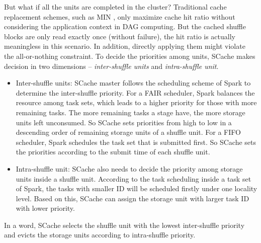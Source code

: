 But what if all the units are completed in the cluster? Traditional cache replacement schemes, such as MIN \cite{min}, only maximize cache hit ratio without considering the application context in DAG computing. But the cached shuffle blocks are only read exactly once (without failure), the hit ratio is actually meaningless in this scenario.
In addition, directly applying them might violate the all-or-nothing constraint.
To decide the priorities among units, SCache makes decision in two dimensions -- \textit{inter-shuffle units} and \textit{intra-shuffle unit}.
\begin{itemize}[noitemsep]
	\item Inter-shuffle units: SCache master follows the scheduling scheme of Spark to determine the inter-shuffle priority. For a FAIR scheduler, Spark balances the resource among task sets, which leads to a higher priority for those with more remaining tasks. The more remaining tasks a stage have, the more storage units left unconsumed. So SCache sets priorities from high to low in a descending order of remaining storage units of a shuffle unit. For a FIFO scheduler, Spark schedules the task set that is submitted first. So SCache sets the priorities according to the submit time of each shuffle unit.
	\item Intra-shuffle unit: SCache also needs to decide the priority among storage units inside a shuffle unit. According to the task scheduling inside a task set of Spark, the tasks with smaller ID will be scheduled firstly under one locality level. Based on this, SCache can assign the storage unit with larger task ID with lower priority.
\end{itemize}
In a word, SCache selects the shuffle unit with the lowest inter-shuffle priority and evicts the storage units according to intra-shuffle priority.



